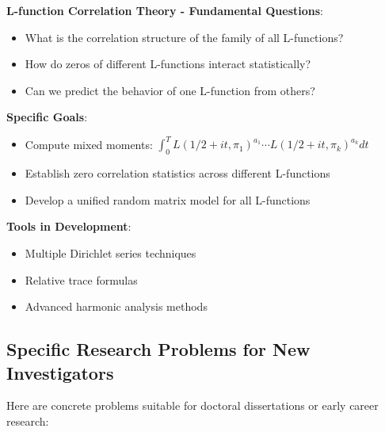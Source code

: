 \noindent\textbf{L-function Correlation Theory - Fundamental Questions}:
\begin{itemize}
\item What is the correlation structure of the family of all L-functions?
\item How do zeros of different L-functions interact statistically?
\item Can we predict the behavior of one L-function from others?
\end{itemize}

\textbf{Specific Goals}:
\begin{itemize}
\item Compute mixed moments: $\int_0^T L(1/2 + it, \pi_1)^{a_1} \cdots L(1/2 + it, \pi_k)^{a_k} dt$
\item Establish zero correlation statistics across different L-functions
\item Develop a unified random matrix model for all L-functions
\end{itemize}

\textbf{Tools in Development}:
\begin{itemize}
\item Multiple Dirichlet series techniques
\item Relative trace formulas
\item Advanced harmonic analysis methods
\end{itemize}

\subsection{Specific Research Problems for New Investigators}
\label{subsec:specific_problems}

Here are concrete problems suitable for doctoral dissertations or early career research:

